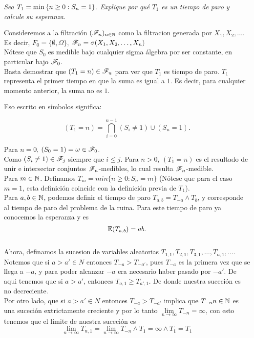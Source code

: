 \emph
{
	Sea $T_1=\min\left\{ n\geq 0:S_n=1\right\} $. Explique por qu\'e $T_1$ es un 
	tiempo de paro y calcule su esperanza.\\
}

	Consideremos a la filtración $(\mathscr{F}_n)_{n\in\mathbb{N}}$ como la filtracion 
	generada por $X_1, X_2, \dots$.\\

	Es decir, $F_0 = \{\emptyset, \Omega\}$, $\mathscr{F}_n = \sigma(X_1, X_2, \dots, X_n)$\\

	Nótese que $S_0$ es medible bajo cualquier sigma álgebra por ser constante, en particular bajo
	$\mathscr{F}_0$.\\

	Basta demostrar que $(T_1 = n) \in \mathscr{F}_n$ para ver que $T_1$ es tiempo de paro. $T_1$ 
	representa el primer tiempo en que la suma es igual a $1$. Es decir, para cualquier 
	momento anterior, la suma no es $1$.

	Eso escrito en símbolos significa:

	$$(T_1 = n) = \bigcap_{i=0}^{n-1}(S_i \not= 1) \cup (S_n = 1).$$ 

	Para $n=0$, $(S_0 = 1) = \omega \in \mathscr{F}_0$. \\

	Como $(S_i \not= 1) \in \mathscr{F}_j$ siempre que $i \leq j$. Para $n>0$, $(T_1 = n)$ es el resultado de 
	unir e intersectar conjuntos $\mathscr{F}_n$-medibles, lo cual resulta $\mathscr{F}_n$-medible.\\

	Para $m \in \mathbb{N}$. Definamos $T_m = min\{n \geq 0 : S_n = m\}$ 
	(Nótese que para el caso $m=1$, esta definición	coincide con la definición previa de $T_1$).\\
	
	Para $a,b \in \mathbb{N}$, podemos definir el tiempo de paro $T_{a,b} = T_{-a} \wedge T_b$, y 
	corresponde al 	tiempo de paro del problema de la ruina. Para este tiempo de paro ya conocemos 
	la esperanza y es
	$$\mathbb{E}(T_{a,b}) = ab.$$\\
	
	Ahora, definamos la sucesion de variables aleatorias $T_{1,1}, T_{2,1}, T_{3,1}, \dots, T_{n,1}, 
	\dots$. Notemos que si $a>a' \in N$ entonces $T_{-a} > T_{-a'}$, pues $T_{-a}$ es la primera vez
	que se llega a $-a$, y para poder alcanzar $-a$ era necesario haber pasado por $-a'$.
	De aqui tenemos que si $a>a'$, entonces $T_{a,1} \geq T_{a',1}$. De donde nuestra suceción es 
	no decreciente.\\
	
	Por otro lado, que si $a>a' \in N$ entonces $T_{-a} > T_{-a'}$ implica que $T_{-n} n \in \mathbb{N}$ es 
	una suceción extrictamente creciente y por lo tanto 
	$\lim\limits_{n \rightarrow \infty} T_{-n} = \infty$, con esto tenemos que el límite de nuestra 
	suceción es 
	$$		
	\lim_{n\rightarrow\infty} T_{n,1} = 
	\lim_{n\rightarrow\infty} T_{-n} \wedge T_1 = 
	\infty \wedge T_1 = 
	T_1
	$$

